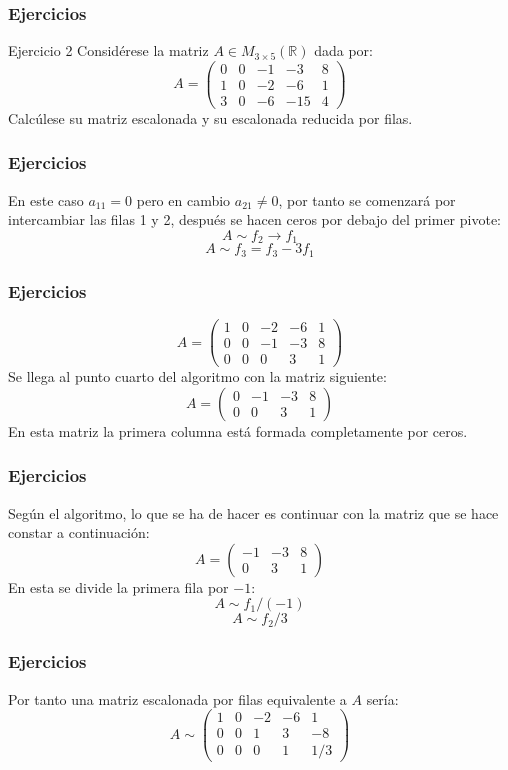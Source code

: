 \documentclass[12pt]{article}
\begin{document}
       \begin{frame}
  \frametitle{Ejercicios}
   \begin{block}{Ejercicio 2}
Consid\'erese la matriz $A\in M_{3\times 5}(\mathbb{R})$ dada por:
\[A= \left(\begin{array}{ccccc}0 & 0 & -1 & -3 & 8 \\1 & 0 & -2 & -6 &1 \\3 & 0 & -6 & -15 & 4\end{array}\right)\]
Calc\'ulese su matriz escalonada y su escalonada reducida por filas. 
\end{block}
  \end{frame} 
    
    
    \begin{frame}
  \frametitle{Ejercicios}
En este caso $a_{11}=0$ pero en cambio $a_{21}\neq 0$, por tanto se comenzar\'a por intercambiar las filas 1 y 2, despu\'es se hacen ceros por debajo del primer pivote:
\[A\sim f_2 \rightarrow f_1\]
\[A\sim f_3 = f_3-3f_1\]
  \end{frame}     
    

    \begin{frame}
  \frametitle{Ejercicios}
\[A= \left(\begin{array}{ccccc}1 & 0 & -2 & -6 &1 \\ 0 & 0 & -1 & -3 & 8 \\ 0 & 0 & 0 & 3 & 1\end{array}\right)\]
Se llega al punto cuarto del algoritmo con la matriz siguiente:
\[A= \left(\begin{array}{cccc} 0 & -1 & -3 & 8 \\ 0 & 0 & 3 & 1\end{array}\right)\]
En esta matriz la primera columna est\'a formada completamente por ceros.
\end{frame}     
  
      \begin{frame}
  \frametitle{Ejercicios}
Seg\'un el algoritmo, lo que se ha de hacer es continuar con la matriz que se hace constar a continuaci\'on:
\[A= \left(\begin{array}{ccc}  -1 & -3 & 8 \\  0 & 3 & 1\end{array}\right)\]
En esta se divide la primera fila por $-1$:
\[A\sim f_1 /(-1)\]
\[A\sim f_2 /3\]

  \end{frame}     
        
 \begin{frame}
  \frametitle{Ejercicios}
Por tanto una matriz escalonada por filas equivalente a $A$ ser\'ia:
\[A\sim \left(\begin{array}{ccccc}1 & 0 & -2 & -6 &1 \\ 0 & 0 & 1 & 3 & -8 \\0 & 0 & 0 & 1 & 1/3\end{array}\right)\]
  \end{frame}     
\end{document}
